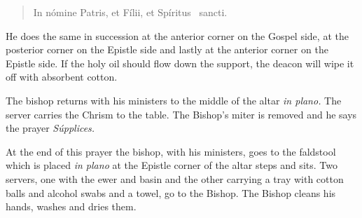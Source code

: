 \documentclass[letterpaper]{report}
\begin{document}
{    \begin{quote}
        In nómine Pa\cross tris, et Fí\cross lii, et Spíritus \cross\ sancti.
    \end{quote}

    He does the same in succession at the anterior corner on the Gospel side, at
    the posterior corner on the Epistle side and lastly at the anterior corner on
    the Epistle side. If the holy oil should flow down the support, the deacon will
    wipe it off with absorbent cotton.

    \rubric The bishop returns with his ministers to the middle of the altar
    \textit{in plano.} The server carries the Chrism to the table. The Bishop's
    miter is removed and he says the prayer \textit{Súpplices.}

    \rubric At the end of this prayer the bishop, with his ministers, goes to the
    faldstool which is placed \textit{in plano} at the Epistle corner of the altar
    steps and sits. Two servers, one with the ewer and basin and the other carrying
    a tray with cotton balls and alcohol swabs and a towel, go to the Bishop. The
    Bishop cleans his hands, washes and dries them.

}
\end{document}
